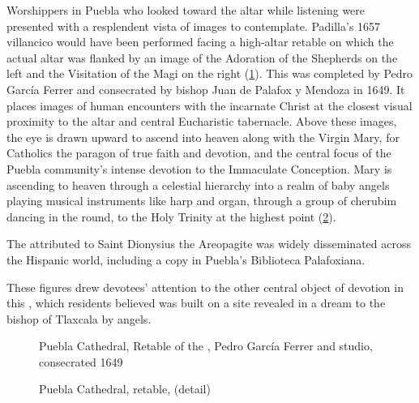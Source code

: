 Worshippers in Puebla who looked toward the altar while listening were presented
with a resplendent vista of images to contemplate.
Padilla's 1657 villancico would have been performed facing a high-altar retable
on which the actual altar was flanked by an image of the Adoration of the
Shepherds on the left and the Visitation of the Magi on the right
(\cref{fig:Puebla-Ferrer-Retablo}).
This  was completed by Pedro García Ferrer and
consecrated by bishop Juan de Palafox y Mendoza in 1649.
It places images of human encounters with the incarnate Christ at the closest
visual proximity to the altar and central Eucharistic tabernacle.%
    \Autocite{Gali:GarciaFerrer}
Above these images, the eye is drawn upward to ascend into heaven along with the
Virgin Mary, for Catholics the paragon of true faith and devotion, and the
central focus of the Puebla community's intense devotion to the Immaculate
Conception.
Mary is ascending to heaven through a celestial hierarchy  into a realm of baby
angels playing musical instruments like harp and organ, through a group of
cherubim dancing in the round, to the Holy Trinity at the highest point
(\cref{fig:Puebla-Ferrer-BMV}).%
\begin{Footnote}
    The  attributed to Saint Dionysius the
    Areopagite was widely disseminated across the Hispanic world, including a
    copy in Puebla's Biblioteca Palafoxiana.
\end{Footnote}
These figures drew devotees' attention to the other central object of devotion
in this , which residents believed was built on a
site revealed in a dream to the bishop of Tlaxcala by angels.%
    \Autocites
    [67--68]{Lomeli:Puebla}
    [21]{AngelContreras:Puebla}

\begin{figure}
    \caption{Puebla Cathedral, Retable of the , Pedro
    García Ferrer and studio, consecrated 1649}
  
    \label{fig:Puebla-Ferrer-Retablo}
 
\end{figure}

\begin{figure}
    \caption{Puebla Cathedral, retable, 
    (detail)} 
  
    \label{fig:Puebla-Ferrer-BMV}

\end{figure}

